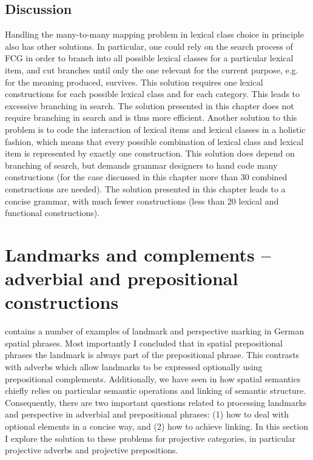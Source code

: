 \subsection{Discussion}
Handling the many-to-many mapping problem in lexical class choice
in principle also has other solutions. In particular, one could
rely on the search process of FCG in order to branch into all possible
lexical classes for a particular lexical item, and cut branches until only the 
one relevant for the current purpose, e.g. for the meaning produced, survives. 
This solution requires one lexical constructions for each possible lexical class
and for each category. This leads to excessive branching in search. 
The solution presented in this chapter does not require branching
in search and is thus more efficient. Another solution to this problem
is to code the interaction of lexical items and lexical classes in a holistic
fashion, which means that every possible combination of lexical class 
and lexical item is represented by exactly one construction. This 
solution does depend on branching of search, but demands grammar
designers to hand code many constructions (for the case discussed in
this chapter more than 30 combined constructions are needed). 
The solution presented in this chapter leads to a concise grammar,
with much fewer constructions (less than 20 lexical and functional constructions).


\section{Landmarks and complements -- 
adverbial and prepositional constructions}
\label{s:landmarks+complements}
 contains a number of 
examples of landmark and perspective marking in German spatial 
phrases. Most importantly I concluded that in spatial prepositional phrases 
the landmark is always part of the prepositional phrase. This contrasts 
with adverbs which allow landmarks to be expressed optionally
using prepositional complements. Additionally, we have seen in
 how spatial semantics chiefly relies on particular 
semantic operations and linking of semantic structure. Consequently, 
there are two important questions related to processing landmarks and 
perspective in adverbial and prepositional phrases: (1) how to deal with 
optional elements in a concise way, and (2) how to achieve linking. 
In this section I explore the solution to these problems for projective categories, 
in particular projective adverbs and projective prepositions. 


